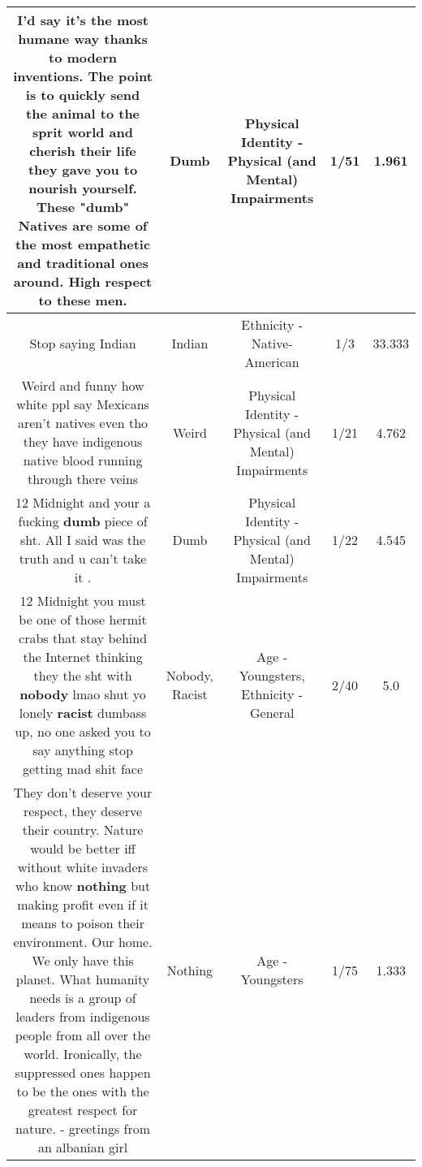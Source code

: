 \documentclass[11pt]{article}
\newlength\mylength
\begin{document}
\begin{center}
\begin{longtable}{|C{.65\mylength}|C{.30\mylength}|C{.12\mylength}|C{.12\mylength}|C{.12\mylength}|}
  \small I'd say it's the most humane way thanks to modern inventions. The point is to quickly send the animal to the sprit world and cherish their life they gave you to nourish yourself. These "\textbf{dumb}" Natives are some of the most empathetic and traditional ones around. High respect to these men.\normalsize   & Dumb & Physical Identity - Physical (and Mental) Impairments & 1/51 & 1.961 \\  \hline
  \small Stop saying Indian\normalsize   & Indian & Ethnicity - Native-American & 1/3 & 33.333 \\  \hline
  \small Weird and funny how white ppl say Mexicans aren't natives even tho they have indigenous native blood running through there veins\normalsize   & Weird & Physical Identity - Physical (and Mental) Impairments & 1/21 & 4.762 \\  \hline
  \small 12 Midnight and your a fucking \textbf{dumb} piece of sht. All I said was the truth and u can't take it .\normalsize   & Dumb & Physical Identity - Physical (and Mental) Impairments & 1/22 & 4.545 \\  \hline
  \small 12 Midnight you must be one of those hermit crabs that stay behind the Internet thinking they the sht with \textbf{nobody} lmao shut yo lonely \textbf{racist} dumbass up, no one asked you to say anything stop getting mad shit face\normalsize   & Nobody, Racist & Age - Youngsters, Ethnicity - General & 2/40 & 5.0 \\  \hline
  \small They don't deserve your respect, they deserve their country. Nature would be better iff without white invaders who know \textbf{nothing} but making profit even if it means to poison their environment. Our home. We only have this planet. What humanity needs is a group of leaders from indigenous people from all over the world. Ironically, the suppressed ones happen to be the ones with the greatest respect for nature. - greetings from an albanian girl\normalsize   & Nothing & Age - Youngsters & 1/75 & 1.333 \\  \hline

\end{longtable}
\end{center}
\end{document}
